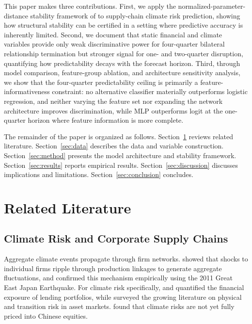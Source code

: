 \documentclass[12pt]{article}
\begin{document}
This paper makes three contributions.  First, we apply the
normalized-parameter-distance stability framework of
\citet{stability2024framework} to supply-chain climate risk prediction,
showing how structural stability can be certified in a setting where
predictive accuracy is inherently limited.  Second, we document that static
financial and climate variables provide only weak discriminative power for
four-quarter bilateral relationship termination but stronger signal for
one- and two-quarter disruption, quantifying how predictability decays with
the forecast horizon.  Third, through model comparison, feature-group
ablation, and architecture sensitivity analysis, we show that the
four-quarter predictability ceiling is primarily a feature-informativeness
constraint: no alternative classifier materially outperforms logistic
regression, and neither varying the feature set nor expanding the network
architecture improves discrimination, while MLP outperforms logit at the
one-quarter horizon where feature information is more complete.

The remainder of the paper is organized as follows.  Section~\ref{sec:lit}
reviews related literature.  Section~\ref{sec:data} describes the data and
variable construction.  Section~\ref{sec:method} presents the model
architecture and stability framework.  Section~\ref{sec:results} reports
empirical results.  Section~\ref{sec:discussion} discusses implications and
limitations.  Section~\ref{sec:conclusion} concludes.

\section{Related Literature}\label{sec:lit}

\subsection{Climate Risk and Corporate Supply Chains}

Aggregate climate events propagate through firm networks.
\citet{acemoglu2012network} showed that shocks to individual firms ripple
through production linkages to generate aggregate fluctuations, and
\citet{carvalho2021supply} confirmed this mechanism empirically using the
2011 Great East Japan Earthquake.  For climate risk specifically,
\citet{dietz2016climate} and \citet{battiston2017climate} quantified the
financial exposure of lending portfolios, while \citet{giglio2021climate}
surveyed the growing literature on physical and transition risk in asset
markets.  \citet{hong2019climate} found that climate risks are not yet
fully priced into Chinese equities.
\end{document}
